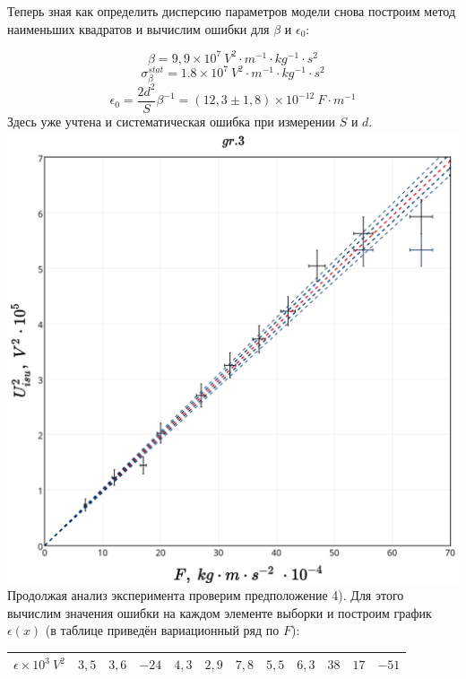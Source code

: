 Теперь зная как определить дисперсию параметров модели снова построим метод наименьших квадратов и  вычислим ошибки для $\beta$ и $\epsilon_0$:

$$ \beta = 9,9 \times 10^7 \ V^2 \cdot m^{-1} \cdot kg^{-1} \cdot s^2$$
$$ \sigma_\beta^{stat} = 1.8 \times 10^7 \ V^2 \cdot m^{-1} \cdot kg^{-1} \cdot s^2$$
$$ \epsilon_0 = \frac{2d^2}{S} \beta^{-1} = (12,3 \pm 1,8) \times 10^{-12} \ F \cdot m^{-1} $$
Здесь уже учтена и систематическая ошибка при измерении $S$ и $d$. \\

\includegraphics[scale = 0.20]{my_plot3.png}\\

Продолжая анализ эксперимента проверим предположение 4).
Для этого вычислим значения ошибки на каждом элементе выборки и построим график $\epsilon(x)$ (в таблице приведён вариационный ряд по $F$): 

\begin{center}
\begin{tabular}{|c|*{11}{c|}}
\hline
{$\epsilon \times 10^{3} \ V^2$} & $3,5$ &  $3,6$ & $-24$ & $4,3$ & $2,9$ & $7,8$ & $5,5$ & $6,3$ & $38$ & $17$ & $-51$ \\
\hline
\end{tabular}
\end{center}

